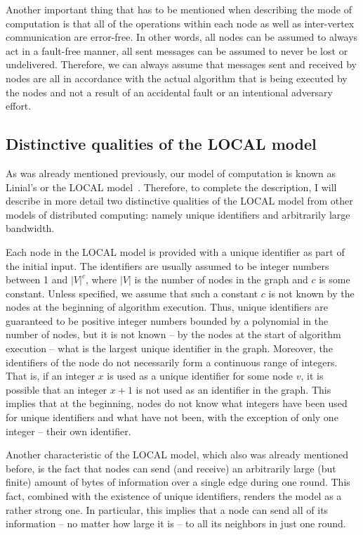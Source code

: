 Another important thing that has to be mentioned when describing the mode of computation
is that all of the operations within each node as well as inter-vertex
communication are error-free. In other words, all nodes can be assumed to
always act in a fault-free manner, all sent messages can be assumed to never be lost
or undelivered. Therefore, we can always assume that messages sent and received by nodes
are all in accordance with the actual algorithm that is being executed by the nodes
and not a result of an accidental fault or an intentional adversary effort.

\subsection{Distinctive qualities of the LOCAL model}

As was already mentioned previously, our model of computation is known
as Linial's or the LOCAL model~\cite{Linial1987}. Therefore, to complete the
description, I will describe in more detail two distinctive qualities of the LOCAL model
from other models of distributed computing: namely unique identifiers and arbitrarily large
bandwidth.

Each node in the LOCAL model is provided with a unique identifier as part of the initial input.
The identifiers are usually assumed to be integer numbers between 1 and $|V|^c$, where
$|V|$ is the number of nodes in the graph and $c$ is some constant. Unless specified, we
assume that such a constant $c$ is not known by the nodes at the beginning of
algorithm execution. Thus, unique identifiers are guaranteed to be positive integer
numbers bounded by a polynomial in the number of nodes, but it is not known -- by the nodes
at the start of algorithm execution -- what is the largest unique identifier in the graph. Moreover,
the identifiers of the node do not necessarily form a continuous range of integers. That is,
if an integer $x$ is used as a unique identifier for some node $v$, it is possible
that an integer $x+1$ is not used as an identifier in the graph. This implies that at
the beginning, nodes do not know what integers have been used for unique identifiers
and what have not been, with the exception of only one integer -- their own identifier.

Another characteristic of the LOCAL model, which also was already mentioned before, is the fact
that nodes can send (and receive) an arbitrarily large (but finite)
amount of bytes of information over a single edge during one round. This fact,
combined with the existence of unique identifiers, renders the model as a rather strong one.
In particular, this implies that a node can send all of its information -- no matter how
large it is -- to all its neighbors in just one round.

